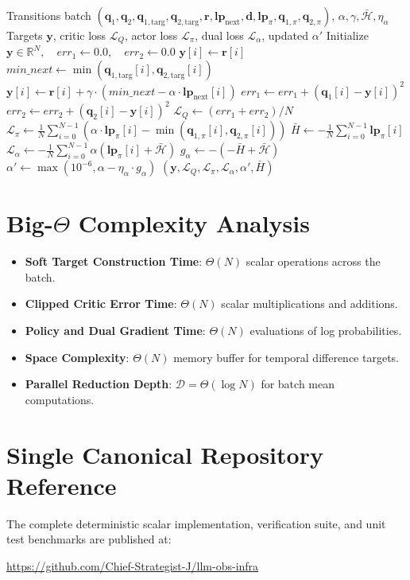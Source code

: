 \documentclass[11pt,a4paper]{article}
\theoremstyle{definition}
\begin{document}
\begin{algorithm}[H]
\caption{Soft Actor-Critic Evaluation and Dual Temperature Update}
\begin{algorithmic}[1]
\Require Transitions batch $(\mathbf{q}_1, \mathbf{q}_2, \mathbf{q}_{1,\text{targ}}, \mathbf{q}_{2,\text{targ}}, \mathbf{r}, \mathbf{lp}_{\text{next}}, \mathbf{d}, \mathbf{lp}_{\pi}, \mathbf{q}_{1,\pi}, \mathbf{q}_{2,\pi})$, $\alpha, \gamma, \bar{\mathcal{H}}, \eta_\alpha$
\Ensure Targets $\mathbf{y}$, critic loss $\mathcal{L}_Q$, actor loss $\mathcal{L}_\pi$, dual loss $\mathcal{L}_\alpha$, updated $\alpha'$
\State Initialize $\mathbf{y} \in \mathbb{R}^N, \quad err_1 \gets 0.0, \quad err_2 \gets 0.0$
        \State $\mathbf{y}[i] \gets \mathbf{r}[i]$
    \Else
        \State $min\_next \gets \min(\mathbf{q}_{1,\text{targ}}[i], \mathbf{q}_{2,\text{targ}}[i])$
        \State $\mathbf{y}[i] \gets \mathbf{r}[i] + \gamma \cdot (min\_next - \alpha \cdot \mathbf{lp}_{\text{next}}[i])$
    \EndIf
    \State $err_1 \gets err_1 + (\mathbf{q}_1[i] - \mathbf{y}[i])^2$
    \State $err_2 \gets err_2 + (\mathbf{q}_2[i] - \mathbf{y}[i])^2$
\EndFor
\State $\mathcal{L}_Q \gets (err_1 + err_2) / N$
\State $\mathcal{L}_\pi \gets \frac{1}{N}\sum_{i=0}^{N-1} (\alpha \cdot \mathbf{lp}_\pi[i] - \min(\mathbf{q}_{1,\pi}[i], \mathbf{q}_{2,\pi}[i]))$
\State $\bar{H} \gets - \frac{1}{N}\sum_{i=0}^{N-1} \mathbf{lp}_\pi[i]$
\State $\mathcal{L}_\alpha \gets - \frac{1}{N}\sum_{i=0}^{N-1} \alpha (\mathbf{lp}_\pi[i] + \bar{\mathcal{H}})$
\State $g_\alpha \gets - (-\bar{H} + \bar{\mathcal{H}})$
\State $\alpha' \gets \max(10^{-6}, \alpha - \eta_\alpha \cdot g_\alpha)$
\State \Return $(\mathbf{y}, \mathcal{L}_Q, \mathcal{L}_\pi, \mathcal{L}_\alpha, \alpha', \bar{H})$
\end{algorithmic}
\end{algorithm}

\section{Big-$\Theta$ Complexity Analysis}

\begin{itemize}
    \item \textbf{Soft Target Construction Time}: $\Theta(N)$ scalar operations across the batch.
    \item \textbf{Clipped Critic Error Time}: $\Theta(N)$ scalar multiplications and additions.
    \item \textbf{Policy and Dual Gradient Time}: $\Theta(N)$ evaluations of log probabilities.
    \item \textbf{Space Complexity}: $\Theta(N)$ memory buffer for temporal difference targets.
    \item \textbf{Parallel Reduction Depth}: $\mathcal{D} = \Theta(\log N)$ for batch mean computations.
\end{itemize}

\section{Single Canonical Repository Reference}

The complete deterministic scalar implementation, verification suite, and unit test benchmarks are published at:
\begin{center}
\url{https://github.com/Chief-Strategist-J/llm-obs-infra}
\end{center}
\end{document}
